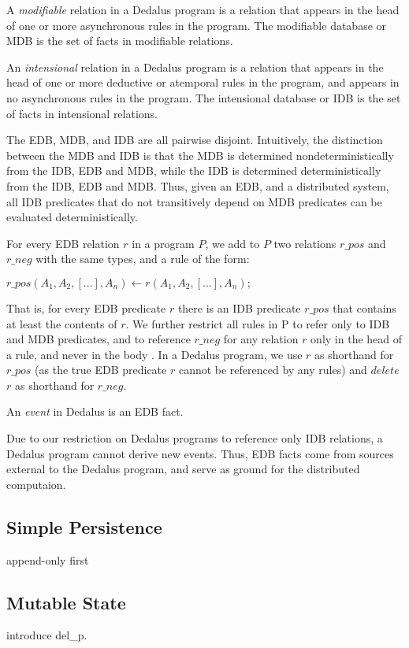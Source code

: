 \documentclass{acm_proc_article-sp-sigmod09}
\newcommand{\paa}[1]{{\textcolor{blue}{#1 -- paa}}}
\newcommand{\wrm}[1]{{\color{BurntOrange}{#1 -- wrm}}}
\begin{document}
 \begin{definition}
%
A \emph{modifiable} relation in a Dedalus program is a relation that appears in
the head of one or more asynchronous rules in the program.  The modifiable
database or MDB is the set of facts in modifiable relations.
%
\end{definition}

 \begin{definition}
%
An \emph{intensional} relation in a Dedalus program is a relation that appears
in the head of one or more deductive or atemporal rules in the program, and
appears in no asynchronous rules in the program.  The intensional database or
IDB is the set of facts in intensional relations.
%
\end{definition}

The EDB, MDB, and IDB are all pairwise disjoint.  Intuitively, the distinction
between the MDB and IDB is that the MDB is determined nondeterministically from
the IDB, EDB and MDB, while the IDB is determined deterministically from the
IDB, EDB and MDB.  Thus, given an EDB, and a distributed system, all IDB
predicates that do not transitively depend on MDB predicates can be evaluated
deterministically.

For every EDB relation $r$ in a program $P$, we add to $P$ two relations
$r\_pos$ and $r\_neg$ with the same types, and a rule of the form:

$r\_pos(A_1, A_2, [...], A_n) \leftarrow r(A_1, A_2, [...], A_n);$

That is, for every EDB predicate $r$ there is an IDB predicate $r\_pos$ that
contains at least the contents of $r$.  We further restrict all rules in P to
refer only to IDB and MDB predicates, and to reference $r\_neg$ for any relation $r$
only in the head of a rule, and never in the body \wrm{then, how do we write
inductive rules?}.  In a Dedalus program, we use $r$ as shorthand for $r\_pos$
(as the true EDB predicate $r$ cannot be referenced by any rules) and
$delete$ $r$ as shorthand for $r\_neg$.

 \begin{definition}
%
An \emph{event} in Dedalus is an EDB fact.
%
\end{definition}

Due to our restriction on Dedalus programs to reference only IDB relations, a
Dedalus program cannot derive new events.  Thus, EDB facts come from sources
external to the Dedalus program, and serve as ground for the distributed
computaion.

\subsection{Simple Persistence}

append-only first

\subsection{Mutable State}

introduce del\_p.
\end{document}
